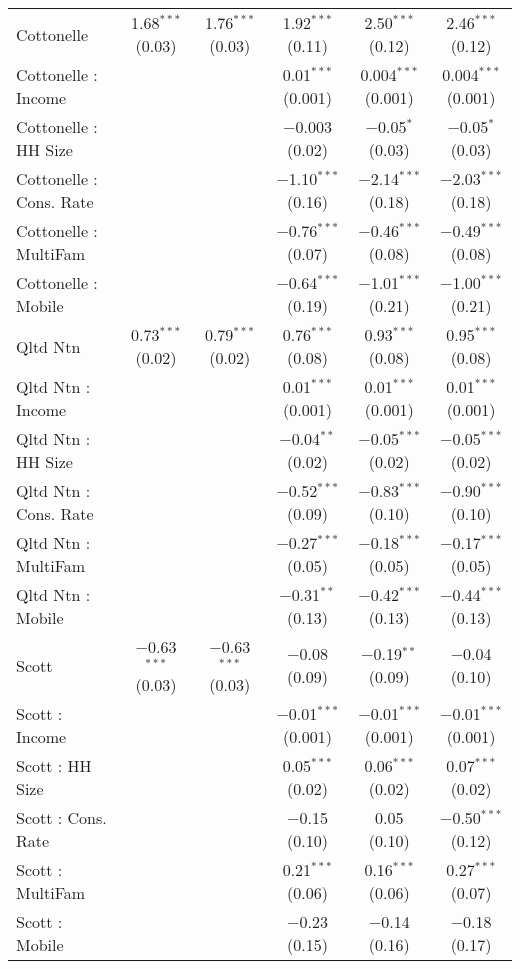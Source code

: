\begin{table}[!htbp]
\begin{tabular}{@{\extracolsep{5pt}}lccccc}
  Cottonelle & 1.68$^{***}$ (0.03) & 1.76$^{***}$ (0.03) & 1.92$^{***}$ (0.11) & 2.50$^{***}$ (0.12) & 2.46$^{***}$ (0.12) \\ 
  Cottonelle : Income &  &  & 0.01$^{***}$ (0.001) & 0.004$^{***}$ (0.001) & 0.004$^{***}$ (0.001) \\ 
  Cottonelle : HH Size &  &  & $-$0.003 (0.02) & $-$0.05$^{*}$ (0.03) & $-$0.05$^{*}$ (0.03) \\ 
  Cottonelle : Cons. Rate &  &  & $-$1.10$^{***}$ (0.16) & $-$2.14$^{***}$ (0.18) & $-$2.03$^{***}$ (0.18) \\ 
  Cottonelle : MultiFam &  &  & $-$0.76$^{***}$ (0.07) & $-$0.46$^{***}$ (0.08) & $-$0.49$^{***}$ (0.08) \\ 
  Cottonelle : Mobile &  &  & $-$0.64$^{***}$ (0.19) & $-$1.01$^{***}$ (0.21) & $-$1.00$^{***}$ (0.21) \\ 
  Qltd Ntn & 0.73$^{***}$ (0.02) & 0.79$^{***}$ (0.02) & 0.76$^{***}$ (0.08) & 0.93$^{***}$ (0.08) & 0.95$^{***}$ (0.08) \\ 
  Qltd Ntn : Income &  &  & 0.01$^{***}$ (0.001) & 0.01$^{***}$ (0.001) & 0.01$^{***}$ (0.001) \\ 
  Qltd Ntn : HH Size &  &  & $-$0.04$^{**}$ (0.02) & $-$0.05$^{***}$ (0.02) & $-$0.05$^{***}$ (0.02) \\ 
  Qltd Ntn : Cons. Rate &  &  & $-$0.52$^{***}$ (0.09) & $-$0.83$^{***}$ (0.10) & $-$0.90$^{***}$ (0.10) \\ 
  Qltd Ntn : MultiFam &  &  & $-$0.27$^{***}$ (0.05) & $-$0.18$^{***}$ (0.05) & $-$0.17$^{***}$ (0.05) \\ 
  Qltd Ntn : Mobile &  &  & $-$0.31$^{**}$ (0.13) & $-$0.42$^{***}$ (0.13) & $-$0.44$^{***}$ (0.13) \\ 
  Scott & $-$0.63$^{***}$ (0.03) & $-$0.63$^{***}$ (0.03) & $-$0.08 (0.09) & $-$0.19$^{**}$ (0.09) & $-$0.04 (0.10) \\ 
  Scott : Income &  &  & $-$0.01$^{***}$ (0.001) & $-$0.01$^{***}$ (0.001) & $-$0.01$^{***}$ (0.001) \\ 
  Scott : HH Size &  &  & 0.05$^{***}$ (0.02) & 0.06$^{***}$ (0.02) & 0.07$^{***}$ (0.02) \\ 
  Scott : Cons. Rate &  &  & $-$0.15 (0.10) & 0.05 (0.10) & $-$0.50$^{***}$ (0.12) \\ 
  Scott : MultiFam &  &  & 0.21$^{***}$ (0.06) & 0.16$^{***}$ (0.06) & 0.27$^{***}$ (0.07) \\ 
  Scott : Mobile &  &  & $-$0.23 (0.15) & $-$0.14 (0.16) & $-$0.18 (0.17) \\ 

\end{tabular}
\end{table}
